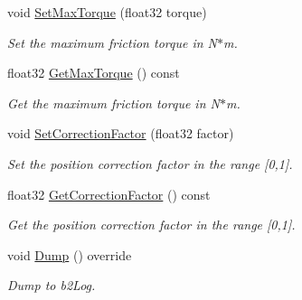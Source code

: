 \begin{DoxyCompactItemize}
void \mbox{\hyperlink{classb2MotorJoint_a3e9a259d36c36e0dc078282e6799d625}{Set\+Max\+Torque}} (float32 torque)
\begin{DoxyCompactList}\small\item\em Set the maximum friction torque in N$\ast$m. \end{DoxyCompactList}\item 
\mbox{\label{classb2MotorJoint_a40d4e4e852a6a722708f0c47b5c9fd69}} 
float32 \mbox{\hyperlink{classb2MotorJoint_a40d4e4e852a6a722708f0c47b5c9fd69}{Get\+Max\+Torque}} () const
\begin{DoxyCompactList}\small\item\em Get the maximum friction torque in N$\ast$m. \end{DoxyCompactList}\item 
\mbox{\label{classb2MotorJoint_ae59e624b8a7b6f869ab5e6148352cb52}} 
void \mbox{\hyperlink{classb2MotorJoint_ae59e624b8a7b6f869ab5e6148352cb52}{Set\+Correction\+Factor}} (float32 factor)
\begin{DoxyCompactList}\small\item\em Set the position correction factor in the range \mbox{[}0,1\mbox{]}. \end{DoxyCompactList}\item 
\mbox{\label{classb2MotorJoint_a429f9656d9f39e6e992de59c9620d6c6}} 
float32 \mbox{\hyperlink{classb2MotorJoint_a429f9656d9f39e6e992de59c9620d6c6}{Get\+Correction\+Factor}} () const
\begin{DoxyCompactList}\small\item\em Get the position correction factor in the range \mbox{[}0,1\mbox{]}. \end{DoxyCompactList}\item 
\mbox{\label{classb2MotorJoint_abb67754f39b4747ae07af5cb5b348836}} 
void \mbox{\hyperlink{classb2MotorJoint_abb67754f39b4747ae07af5cb5b348836}{Dump}} () override
\begin{DoxyCompactList}\small\item\em Dump to b2\+Log. \end{DoxyCompactList}\end{DoxyCompactItemize}
